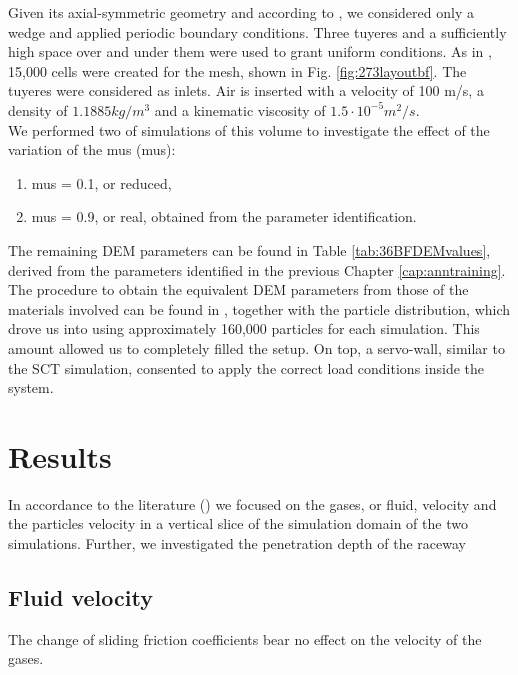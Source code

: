 Given its axial-symmetric geometry and according to \citet{RefWorks:208}, we
considered only a wedge and applied periodic boundary conditions.
Three tuyeres and a sufficiently high space over and under them were used to
grant uniform conditions.
As in \citet{RefWorks:208}, 15,000 cells were created for the mesh, shown in
Fig. \ref{fig:273layoutbf}. 
The tuyeres were considered as inlets. Air is inserted with a velocity of 100
m/s, a density of $1.1885 kg/m^3$ and a kinematic viscosity of $1.5 \cdot
10^{-5} m^2/s$.\\
We performed two of simulations of this volume to investigate
the effect of the variation of the \acl{mus} (\acs{mus}):
\begin{enumerate}
  \item{\acs{mus} = 0.1, or reduced,}
  \item{\acs{mus} = 0.9, or real, obtained from the parameter identification.}
\end{enumerate}
The remaining \acs{DEM} parameters can be found in Table
\ref{tab:36BFDEMvalues}, derived from the parameters identified in the previous
Chapter \ref{cap:anntraining}.
The procedure to obtain the equivalent \acs{DEM} parameters from those of the
materials involved can be found in \citet{RefWorks:208}, together with the
particle distribution, which drove us into using approximately 160,000 particles
for each simulation.
This amount allowed us to completely filled the setup.
On top, a servo-wall, similar to the \acs{SCT} simulation, consented to apply
the correct load conditions inside the system.




\section{Results}
\label{sec:resultsbf}

In accordance to the literature (\cite{RefWorks:203, RefWorks:208}) we focused
on the gases, or fluid, velocity and the particles velocity in a vertical slice
of the simulation domain of the two simulations.
Further, we investigated the penetration depth of the raceway 

\subsection{Fluid velocity}
\label{subsec:fluidvelocity}

The change of sliding friction coefficients bear no effect on the
velocity of the gases. 

